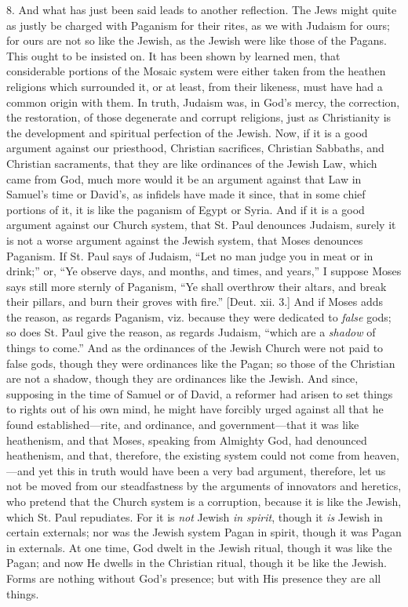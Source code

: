 8. And what has just been said leads to another reflection. The
Jews might quite as justly be charged with Paganism for their rites,
as we with Judaism for ours; for ours are not so like the Jewish, as
the Jewish were like those of the Pagans. This ought to be insisted
on. It has been shown by learned men, that considerable portions of
the Mosaic system were either taken from the heathen religions which
surrounded it, or at least, from their likeness, must have had a
common origin with them. In truth, Judaism was, in God's mercy, the
correction, the restoration, of those degenerate and corrupt
religions, just as Christianity is the development and spiritual
perfection of the Jewish. Now, if it is a good argument against our
priesthood, Christian sacrifices, Christian Sabbaths, and Christian
sacraments, that they are like ordinances of the Jewish Law, which
came from God, much more would it be an argument against that Law in
Samuel's time or David's, as infidels have made it since, that in some
chief portions of it, it is like the paganism of Egypt or Syria. And
if it is a good argument against our Church system, that St. Paul
denounces Judaism, surely it is not a worse argument against the
Jewish system, that Moses denounces Paganism. If St. Paul says of
Judaism, ``Let no man judge you in meat or in drink;'' or,
``Ye observe days, and months, and times, and years,'' I
suppose Moses says still more sternly of Paganism, ``Ye shall
overthrow their altars, and break their pillars, and burn their groves
with fire.'' [Deut. xii. 3.] And if Moses adds the reason, as
regards Paganism, viz. because they were dedicated to \emph{false}
gods; so does St. Paul give the reason, as regards Judaism,
``which are a \emph{shadow} of things to come.'' And as the
ordinances of the Jewish Church were not paid to false gods, though
they were ordinances like the Pagan; so those of the Christian are not
a shadow, though they are ordinances like the Jewish. And since,
supposing in the time of Samuel or of David, a reformer had arisen to
set things to rights out of his own mind, he might have forcibly urged
against all that he found established—rite, and ordinance, and
government—that it was like heathenism, and that Moses, speaking
from Almighty God, had denounced heathenism, and that, therefore, the
existing system could not come from heaven,—and yet this in truth
would have been a very bad argument, therefore, let us not be moved
from our steadfastness by the arguments of innovators and heretics,
who pretend that the Church system is a corruption, because it is like
the Jewish, which St. Paul repudiates. For it is \emph{not} Jewish \emph{in
spirit}, though it \emph{is} Jewish in certain externals; nor was
the Jewish system Pagan in spirit, though it was Pagan in externals.
At one time, God dwelt in the Jewish ritual, though it was like the
Pagan; and now He dwells in the Christian ritual, though it be like
the Jewish. Forms are nothing without God's presence; but with His
presence they are all things.

